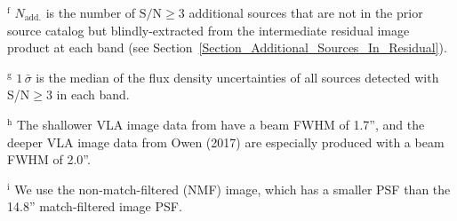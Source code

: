 \begin{table*}
\begin{center}
\begin{minipage}{0.82\textwidth}
$^\mathrm{f}$ 
    $N_{\mathrm{add.}}$ is the number of $\mathrm{S/N}\ge3$ additional sources that are not in the prior source catalog but blindly-extracted from the intermediate residual image product at each band (see Section~\ref{Section_Additional_Sources_In_Residual}). %

$^\mathrm{g}$ 
    $1\,\bar{{\sigma}}$ is the median of the flux density uncertainties of all sources detected with S/N${\ge}3$ in each band. 

$^\mathrm{h}$ 
    The shallower VLA image data from \cite{Morrison2010} have a beam FWHM of 1.7'', and the deeper VLA image data from Owen (2017) are especially produced with a beam FWHM of 2.0''. 

$^\mathrm{i}$ 
    We use the non-match-filtered (NMF) image, which has a smaller PSF than the 14.8'' match-filtered image PSF. 

\end{minipage}

\end{center}

\end{table*}












